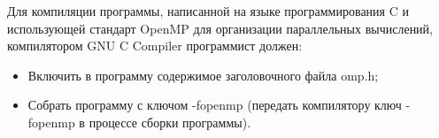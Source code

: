 Для компиляции программы, написанной на языке программирования C и использующей стандарт OpenMP для организации параллельных вычислений, компилятором GNU C Compiler программист должен:

\begin{itemize}

	\item Включить в программу содержимое заголовочного файла omp.h;
	\item Собрать программу с ключом -fopenmp (передать компилятору ключ -fopenmp в процессе сборки программы).

\end{itemize}

